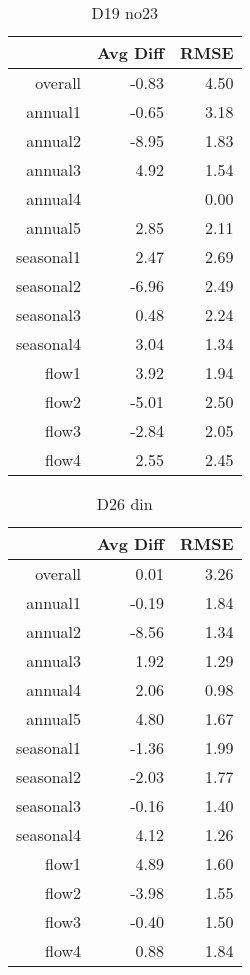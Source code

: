 \begin{table}[H]
\centering
\begin{tabular}{rrr}
  \hline
 & Avg Diff & RMSE \\ 
  \hline
overall & -0.83 & 4.50 \\ 
  annual1 & -0.65 & 3.18 \\ 
  annual2 & -8.95 & 1.83 \\ 
  annual3 & 4.92 & 1.54 \\ 
  annual4 &  & 0.00 \\ 
  annual5 & 2.85 & 2.11 \\ 
  seasonal1 & 2.47 & 2.69 \\ 
  seasonal2 & -6.96 & 2.49 \\ 
  seasonal3 & 0.48 & 2.24 \\ 
  seasonal4 & 3.04 & 1.34 \\ 
  flow1 & 3.92 & 1.94 \\ 
  flow2 & -5.01 & 2.50 \\ 
  flow3 & -2.84 & 2.05 \\ 
  flow4 & 2.55 & 2.45 \\ 
   \hline
\end{tabular}
\caption{D19 no23} 
\end{table}
\begin{table}[H]
\centering
\begin{tabular}{rrr}
  \hline
 & Avg Diff & RMSE \\ 
  \hline
overall & 0.01 & 3.26 \\ 
  annual1 & -0.19 & 1.84 \\ 
  annual2 & -8.56 & 1.34 \\ 
  annual3 & 1.92 & 1.29 \\ 
  annual4 & 2.06 & 0.98 \\ 
  annual5 & 4.80 & 1.67 \\ 
  seasonal1 & -1.36 & 1.99 \\ 
  seasonal2 & -2.03 & 1.77 \\ 
  seasonal3 & -0.16 & 1.40 \\ 
  seasonal4 & 4.12 & 1.26 \\ 
  flow1 & 4.89 & 1.60 \\ 
  flow2 & -3.98 & 1.55 \\ 
  flow3 & -0.40 & 1.50 \\ 
  flow4 & 0.88 & 1.84 \\ 
   \hline
\end{tabular}
\caption{D26 din} 
\end{table}
